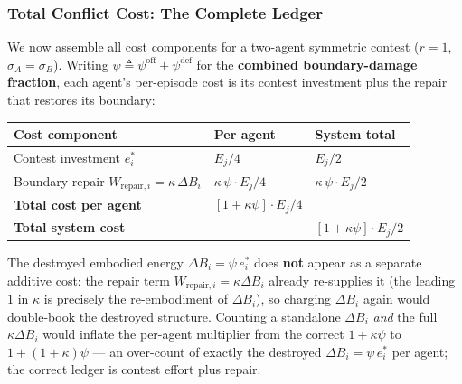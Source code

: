 \documentclass[11pt]{article}
\theoremstyle{plain}
\theoremstyle{definition}
\theoremstyle{remark}
\newcounter{none}
\let\origsubsubsection\subsubsection
\renewcommand{\subsubsection}{\needspace{4\baselineskip}\origsubsubsection}
\begin{document}
\subsubsection{Total Conflict Cost: The Complete
Ledger}\label{total-conflict-cost-the-complete-ledger}

We now assemble all cost components for a two-agent symmetric contest
(\(r = 1\), \(\sigma_A = \sigma_B\)). Writing
\(\psi \triangleq \psi^{\text{off}} + \psi^{\text{def}}\) for the
\textbf{combined boundary-damage fraction}, each agent's per-episode
cost is its contest investment plus the repair that restores its
boundary:

{\def\LTcaptype{none} %
\begin{longtable}[]{@{}
  >{\raggedright\arraybackslash}p{}
  >{\raggedright\arraybackslash}p{}
  >{\raggedright\arraybackslash}p{}@{}}
\toprule\noalign{}
\begin{minipage}[b]{\linewidth}\raggedright
Cost component
\end{minipage} & \begin{minipage}[b]{\linewidth}\raggedright
Per agent
\end{minipage} & \begin{minipage}[b]{\linewidth}\raggedright
System total
\end{minipage} \\
\midrule\noalign{}
\endhead
\bottomrule\noalign{}
\endlastfoot
Contest investment \(e_i^*\) & \(E_j / 4\) & \(E_j / 2\) \\
Boundary repair \(W_{\text{repair},i} = \kappa \, \Delta B_i\) &
\(\kappa \, \psi \cdot E_j / 4\) & \(\kappa \, \psi \cdot E_j / 2\) \\
\textbf{Total cost per agent} & \([1 + \kappa \psi] \cdot E_j / 4\) & \\
\textbf{Total system cost} & & \([1 + \kappa \psi] \cdot E_j/2\) \\
\end{longtable}
}

The destroyed embodied energy \(\Delta B_i = \psi \, e_i^*\) does
\textbf{not} appear as a separate additive cost: the repair term
\(W_{\text{repair},i} = \kappa \Delta B_i\) already re-supplies it (the
leading \(1\) in \(\kappa\) is precisely the re-embodiment of
\(\Delta B_i\)), so charging \(\Delta B_i\) again would double-book the
destroyed structure. Counting a standalone \(\Delta B_i\) \emph{and} the
full \(\kappa \Delta B_i\) would inflate the per-agent multiplier from
the correct \(1+\kappa\psi\) to \(1 + (1+\kappa)\psi\) --- an over-count
of exactly the destroyed \(\Delta B_i = \psi\, e_i^*\) per agent; the
correct ledger is contest effort plus repair.
\end{document}
